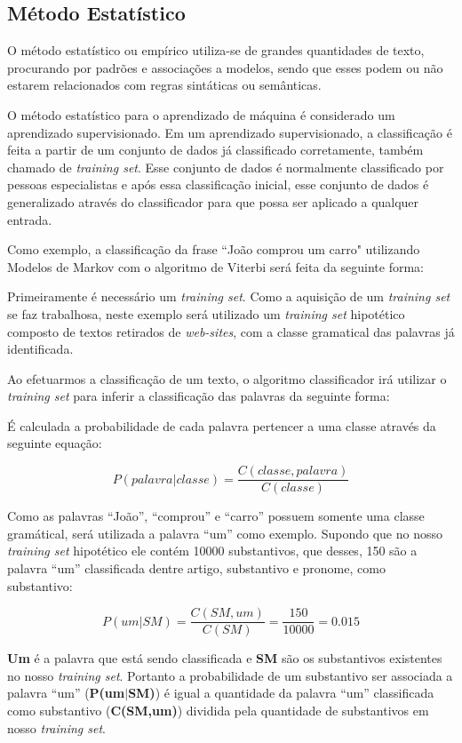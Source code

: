 \subsection{Método Estatístico} 
O método estatístico ou empírico utiliza-se de grandes
quantidades de texto, procurando por padrões e
associações a modelos, sendo que esses podem ou não estarem relacionados com
regras sintáticas ou semânticas. 

O método estatístico para o aprendizado de máquina é considerado um
aprendizado supervisionado. Em um aprendizado supervisionado, a classificação é
feita a partir de um conjunto de dados já classificado corretamente,
também chamado de \textit{training set}. Esse conjunto de dados é normalmente
classificado por pessoas especialistas e após essa classificação inicial, esse
conjunto de dados é generalizado através do classificador para que possa ser
aplicado a qualquer entrada.

Como exemplo, a classificação da frase ``João comprou um
carro" utilizando Modelos de Markov com o algoritmo de
Viterbi será feita da seguinte forma:

Primeiramente é
necessário um \textit{training set}. Como a aquisição de um \textit{training
set} se faz trabalhosa, neste exemplo será utilizado um \textit{training set} hipotético composto de textos retirados de \textit{web-sites}, com a classe gramatical das palavras já
identificada.

Ao efetuarmos a classificação de um texto, o algoritmo
classificador irá utilizar o \textit{training set} para inferir a classificação
das palavras da seguinte forma:

É calculada a probabilidade de cada palavra pertencer a uma classe através da
seguinte equação:

\[ P(palavra|classe) = \frac{C(classe,palavra)}{C(classe)} \]

Como as palavras ``João'', ``comprou'' e ``carro'' possuem somente uma classe
gramátical, será utilizada a palavra ``um'' como exemplo. Supondo que no nosso
\textit{training set} hipotético ele contém 10000 substantivos, que desses, 150
são a palavra ``um'' classificada dentre artigo, substantivo e pronome, como substantivo:

\[ P(um|SM) = \frac{C(SM,um)}{C(SM)} = \frac{150}{10000} = 0.015 \]

\textbf{Um} é a palavra que está sendo classificada e \textbf{SM}
são os substantivos existentes no nosso \textit{training set}. Portanto a
probabilidade de um substantivo ser associada a palavra ``um''
(\textbf{P(um$\vert$SM)}) é igual a quantidade da palavra ``um''
classificada como substantivo (\textbf{C(SM,um)}) dividida pela quantidade de
substantivos em nosso \textit{training set}.

